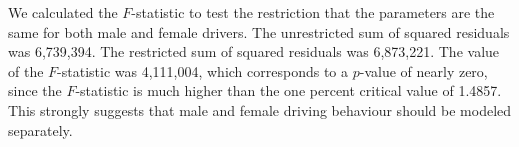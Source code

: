 



We calculated the $F$-statistic to test the restriction 
that the parameters are the same for both male and female drivers. 
The unrestricted sum of squared residuals was 6,739,394. 
The restricted sum of squared residuals was 6,873,221. 
The value of the $F$-statistic was 4,111,004, 
which corresponds to a $p$-value of nearly zero, since the $F$-statistic is much higher than 
 the one percent critical value of 1.4857. 
This strongly suggests that male and female driving behaviour should be modeled separately. 
